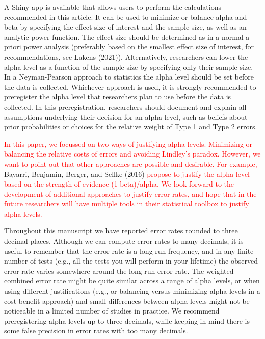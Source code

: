 \documentclass[
  english,
  ,man, a4paper,floatsintext]{apa6}
\begin{document}
A Shiny app is available that allows users to perform the calculations recommended in this article. It can be used to minimize or balance alpha and beta by specifying the effect size of interest and the sample size, as well as an analytic power function. The effect size should be determined as in a normal a-priori power analysis (preferably based on the smallest effect size of interest, for recommendations, see Lakens (2021)). Alternatively, researchers can lower the alpha level as a function of the sample size by specifying only their sample size. In a Neyman-Pearson approach to statistics the alpha level should be set before the data is collected. Whichever approach is used, it is strongly recommended to preregister the alpha level that researchers plan to use before the data is collected. In this preregistration, researchers should document and explain all assumptions underlying their decision for an alpha level, such as beliefs about prior probabilities or choices for the relative weight of Type 1 and Type 2 errors.

\textcolor{red}{In this paper, we focussed on two ways of justifying alpha levels. Minimizing or balancing the relative costs of errors and avoiding Lindley's paradox. However, we want to point out that other approaches are possible and desirable. For example,}
Bayarri, Benjamin, Berger, and Sellke (2016)
\textcolor{red}{propose to justify the alpha level based on the strength of evidence (1-beta)/alpha. We look forward to the development of additional approaches to justify error rates, and hope that in the future researchers will have multiple tools in their statistical toolbox to justify alpha levels.}

Throughout this manuscript we have reported error rates rounded to three decimal places. Although we can compute error rates to many decimals, it is useful to remember that the error rate is a long run frequency, and in any finite number of tests (e.g., all the tests you will perform in your lifetime) the observed error rate varies somewhere around the long run error rate. The weighted combined error rate might be quite similar across a range of alpha levels, or when using different justifications (e.g., or balancing versus minimizing alpha levels in a cost-benefit approach) and small differences between alpha levels might not be noticeable in a limited number of studies in practice. We recommend preregistering alpha levels up to three decimals, while keeping in mind there is some false precision in error rates with too many decimals.
\end{document}
